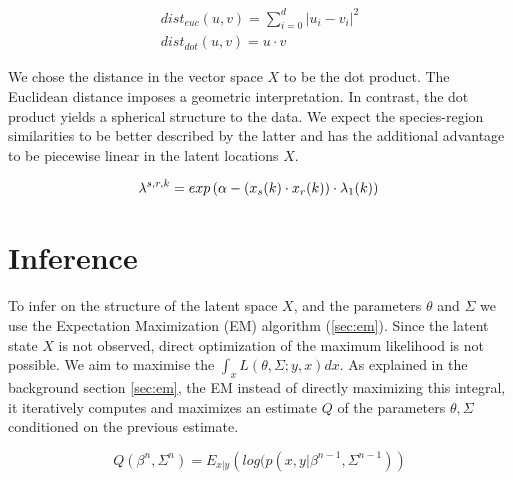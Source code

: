 \documentclass[mscthesis]{usiinfthesis}
\begin{document}
\begin{eqfloat}
\begin{equation}
\begin{array}{l}
dist_{euc}(u, v) = \sum_{i=0}^d |u_i - v_i|^2 \\
dist_{dot}(u, v) = u \cdot v
\end{array}
\label{eq:distance_latentspace}
\end{equation}
\end{eqfloat}

\noindent We chose the distance in the vector space $X$ to be the dot product. The Euclidean distance imposes a geometric interpretation. In contrast, the dot product yields a spherical structure to the data. We expect the species-region similarities to be better described by the latter and has the additional advantage to be piecewise linear in the latent locations $X$.


\begin{eqfloat}
\begin{equation}
\lambda^{s, r, k} = exp\left(\alpha-(x_s(k) \cdot x_r(k)) \cdot \lambda_1(k) \right) \\
\label{eq:ourmodel_lambda}
\end{equation}
\end{eqfloat}

\section{Inference}
To infer on the structure of the latent space $X$, and the parameters $\theta$  and $\Sigma$ we use the Expectation Maximization (EM) algorithm (\ref{sec:em}). Since the latent state $X$ is not observed, direct optimization of the maximum likelihood is not possible. We aim to maximise the $\int_x L(\theta, \Sigma ; y, x) dx$. As explained in the background section \ref{sec:em}, the EM instead of directly maximizing this integral, it iteratively computes and maximizes an estimate $Q$ of the parameters $\theta, \Sigma$ conditioned on the previous estimate. 

\begin{eqfloat}
\begin{equation}
Q(\beta^{n}, \Sigma^{n}) = E_{x|y} \left( log(p(x, y | \beta^{n-1}, \Sigma^{n-1}) \right)
\end{equation}
\label{eq:expectation_maximization}
\end{eqfloat}
\end{document}
